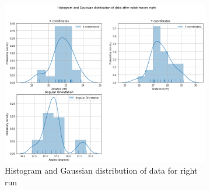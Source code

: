\documentclass[10pt,a4paper]{article}
\begin{document}
				\begin{figure}[H]
				 	\begin{subfigure}{\textwidth}
				 		\centering
				 		\includegraphics[width=\linewidth]{img/histplot_rt.png}
				 		\caption{Histogram and Gaussian distribution of data for right run}
				 	\end{subfigure}
				 	\caption{}%
				 \end{figure}	
				
\end{document}

